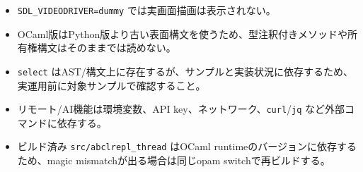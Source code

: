 \documentclass[11pt,a4paper,uplatex,dvipdfmx]{jsarticle}
\begin{document}
\begin{itemize}
  \item \texttt{SDL\_VIDEODRIVER=dummy} では実画面描画は表示されない。
  \item OCaml版はPython版より古い表面構文を使うため、型注釈付きメソッドや所有権構文はそのままでは読めない。
  \item \texttt{select} はAST/構文上に存在するが、サンプルと実装状況に依存するため、実運用前に対象サンプルで確認すること。
  \item リモート/AI機能は環境変数、API key、ネットワーク、\texttt{curl}/\texttt{jq} など外部コマンドに依存する。
  \item ビルド済み \texttt{src/abclrepl\_thread} はOCaml runtimeのバージョンに依存するため、magic mismatchが出る場合は同じopam switchで再ビルドする。
\end{itemize}
\end{document}
